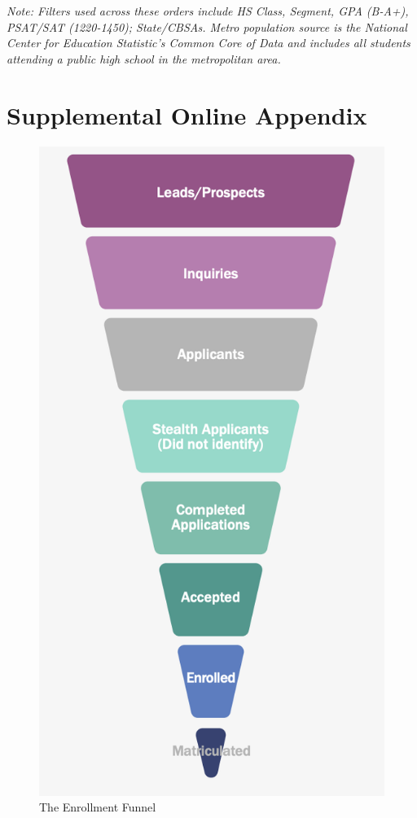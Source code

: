 \documentclass[
  12pt,
]{article}
\newcommand{\beginsupplement}{
\setcounter{table}{0}
\renewcommand{\thetable}{S\arabic{table}}
\setcounter{figure}{0}
\renewcommand{\thefigure}{S\arabic{figure}}}
\begin{document}
\begingroup
\fontsize{10}{10}\selectfont

\emph{Note: Filters used across these orders include HS Class, Segment, GPA (B-A+), PSAT/SAT (1220-1450); State/CBSAs. Metro population source is the National Center for Education Statistic's Common Core of Data and includes all students attending a public high school in the metropolitan area. }
\endgroup

\newpage

\hypertarget{supplemental-online-appendix}{%
\section{Supplemental Online Appendix}\label{supplemental-online-appendix}}

\renewcommand*{\thepage}{A\arabic{page}}
\pagestyle{fancy}
\setlength{\headheight}{15pt}

\beginsupplement

\begin{figure}

{\centering \includegraphics[width=0.45\linewidth]{./../../outputs/images/enroll_funnelv2} 

}

\caption{The Enrollment Funnel}\label{fig:em-funnel}
\end{figure}
\end{document}

